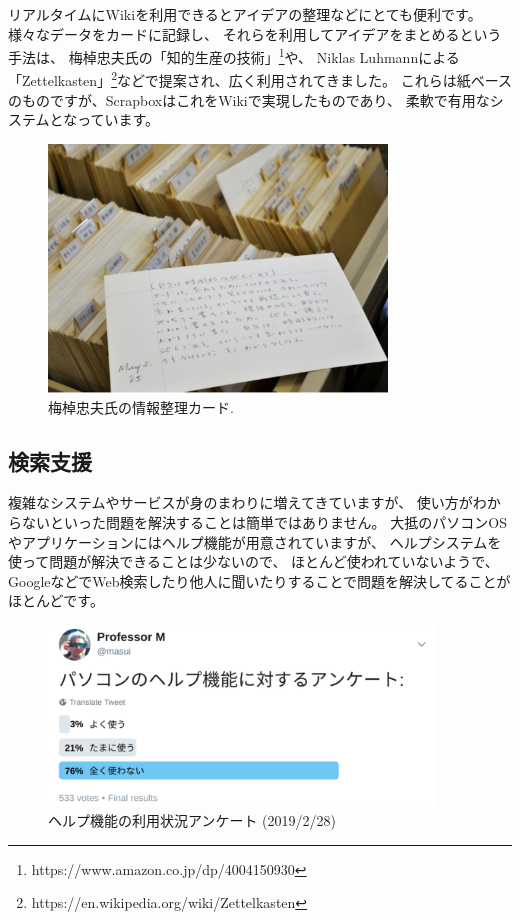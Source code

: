\documentclass[topics]{compsoft} %
\begin{document}
リアルタイムにWikiを利用できるとアイデアの整理などにとても便利です。
様々なデータをカードに記録し、
それらを利用してアイデアをまとめるという手法は、
梅棹忠夫氏の「知的生産の技術」\footnote{
  \textsf{https:{\slash}{\slash}www.amazon.co.jp{\slash}dp{\slash}4004150930}
}や、
Niklas Luhmannによる
「Zettelkasten」\footnote{
  \textsf{https:{\slash}{\slash}en.wikipedia.org{\slash}wiki{\slash}Zettelkasten}
}などで提案され、広く利用されてきました。
これらは紙ベースのものですが、ScrapboxはこれをWikiで実現したものであり、
柔軟で有用なシステムとなっています。

\begin{figure}[t]
  \includegraphics[width=9cm,bb=0 0 1204 882]{figures/1b2d14242e1eb302356a8f49c7450f04.png}
  \caption{梅棹忠夫氏の情報整理カード.}
  \label{umesaocards}
\end{figure}

\subsection{検索支援}

複雑なシステムやサービスが身のまわりに増えてきていますが、
使い方がわからないといった問題を解決することは簡単ではありません。
大抵のパソコンOSやアプリケーションにはヘルプ機能が用意されていますが、
ヘルプシステムを使って問題が解決できることは少ないので、
ほとんど使われていないようで、
GoogleなどでWeb検索したり他人に聞いたりすることで問題を解決してることがほとんどです。

\begin{figure}[t]
  \includegraphics[width=10.3cm,bb=0 0 1332 623]{figures/383ee54c265ebbb88778d7ea0fbea5b1.png}
  \caption{ヘルプ機能の利用状況アンケート (2019/2/28)}
  \label{helpinquiry}
\end{figure}
\end{document}
